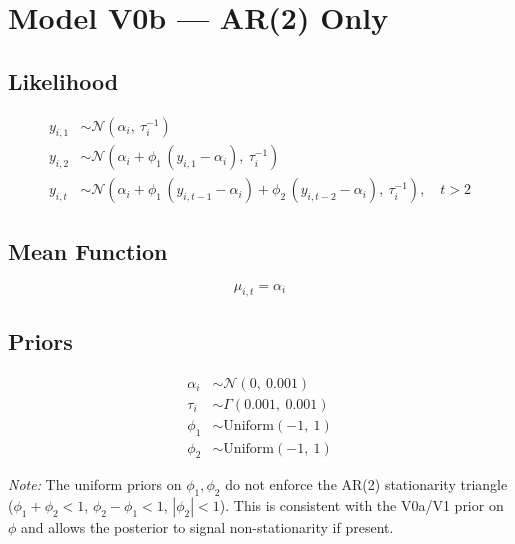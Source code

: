 \documentclass{article}
\begin{document}
\section*{Model V0b --- AR(2) Only}

\subsection*{Likelihood}

\begin{align}
  y_{i,1} &\sim \mathcal{N}(\alpha_i,\ \tau_i^{-1}) \\[6pt]
  y_{i,2} &\sim \mathcal{N}\left(\alpha_i + \phi_1\,(y_{i,1} - \alpha_i),\ \tau_i^{-1}\right) \\[6pt]
  y_{i,t} &\sim \mathcal{N}\left(\alpha_i + \phi_1\,(y_{i,t-1} - \alpha_i) + \phi_2\,(y_{i,t-2} - \alpha_i),\ \tau_i^{-1}\right), \quad t > 2
\end{align}

\subsection*{Mean Function}

\begin{equation}
  \mu_{i,t} = \alpha_i
\end{equation}

\subsection*{Priors}

\begin{align}
  \alpha_i &\sim \mathcal{N}(0,\ 0.001) \\
  \tau_i &\sim \Gamma(0.001,\ 0.001) \\
  \phi_1 &\sim \mathrm{Uniform}(-1,\ 1) \\
  \phi_2 &\sim \mathrm{Uniform}(-1,\ 1)
\end{align}

\noindent\textit{Note:} The uniform priors on $\phi_1, \phi_2$ do not enforce the AR(2) stationarity
triangle ($\phi_1 + \phi_2 < 1$, $\phi_2 - \phi_1 < 1$, $|\phi_2| < 1$).
This is consistent with the V0a/V1 prior on $\phi$ and allows the posterior to
signal non-stationarity if present.
\end{document}
